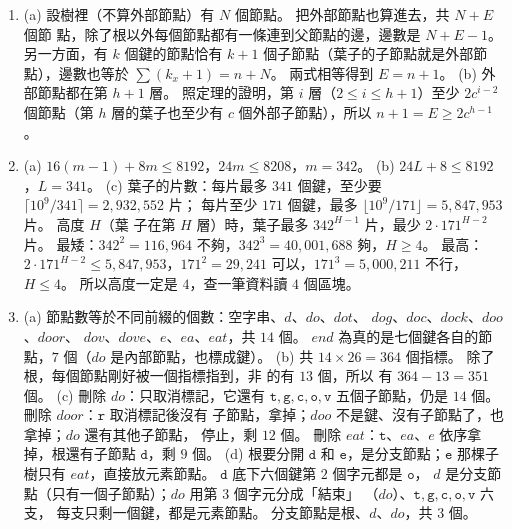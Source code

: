 \begin{enumerate}
\item (a) 設樹裡（不算外部節點）有 $N$ 個節點。 把外部節點也算進去，共 $N + E$ 個節
點，除了根以外每個節點都有一條連到父節點的邊，邊數是 $N + E - 1$。 另一方面，有
$k$ 個鍵的節點恰有 $k + 1$ 個子節點（葉子的子節點就是外部節點），邊數也等於
$\sum (k_x + 1) = n + N$。 兩式相等得到 $E = n + 1$。
(b) 外部節點都在第 $h + 1$ 層。 照定理的證明，第 $i$ 層（$2 \le i \le h + 1$）至少
$2c^{i-2}$ 個節點（第 $h$ 層的葉子也至少有 $c$ 個外部子節點），所以
$n + 1 = E \ge 2c^{h-1}$。

\item (a) $16(m - 1) + 8m \le 8192$，$24m \le 8208$，$m = 342$。
(b) $24L + 8 \le 8192$，$L = 341$。
(c) 葉子的片數：每片最多 $341$ 個鍵，至少要 $\lceil 10^9 / 341 \rceil = 2{,}932{,}552$ 片；
每片至少 $171$ 個鍵，最多 $\lfloor 10^9 / 171 \rfloor = 5{,}847{,}953$ 片。 高度 $H$（葉
子在第 $H$ 層）時，葉子最多 $342^{H-1}$ 片，最少 $2 \cdot 171^{H-2}$ 片。
最矮：$342^2 = 116{,}964$ 不夠，$342^3 = 40{,}001{,}688$ 夠，$H \ge 4$。
最高：$2 \cdot 171^{H-2} \le 5{,}847{,}953$，$171^2 = 29{,}241$ 可以，$171^3 = 5{,}000{,}211$
不行，$H \le 4$。 所以高度一定是 $4$，查一筆資料讀 $4$ 個區塊。

\item (a) 節點數等於不同前綴的個數：空字串、$\mathit{d}$、$\mathit{do}$、$\mathit{dot}$、
$\mathit{dog}$、$\mathit{doc}$、$\mathit{dock}$、$\mathit{doo}$、$\mathit{door}$、
$\mathit{dov}$、$\mathit{dove}$、$\mathit{e}$、$\mathit{ea}$、$\mathit{eat}$，共 $14$ 個。
$\mathit{end}$ 為真的是七個鍵各自的節點，$7$ 個（$\mathit{do}$ 是內部節點，也標成鍵）。
(b) 共 $14 \times 26 = 364$ 個指標。 除了根，每個節點剛好被一個指標指到，非 \NIL 的有
$13$ 個，所以 \NIL 有 $364 - 13 = 351$ 個。
(c) 刪除 $\mathit{do}$：只取消標記，它還有 $\mathtt{t}, \mathtt{g}, \mathtt{c}, \mathtt{o},
\mathtt{v}$ 五個子節點，仍是 $14$ 個。 刪除 $\mathit{door}$：$\mathtt{r}$ 取消標記後沒有
子節點，拿掉；$\mathit{doo}$ 不是鍵、沒有子節點了，也拿掉；$\mathit{do}$ 還有其他子節點，
停止，剩 $12$ 個。 刪除 $\mathit{eat}$：$\mathtt{t}$、$\mathit{ea}$、$\mathit{e}$ 依序拿
掉，根還有子節點 $\mathtt{d}$，剩 $9$ 個。
(d) 根要分開 $\mathtt{d}$ 和 $\mathtt{e}$，是分支節點；$\mathtt{e}$ 那棵子樹只有
$\mathit{eat}$，直接放元素節點。 $\mathtt{d}$ 底下六個鍵第 $2$ 個字元都是 $\mathtt{o}$，
$\mathit{d}$ 是分支節點（只有一個子節點）；$\mathit{do}$ 用第 $3$ 個字元分成「結束」
（$\mathit{do}$）、$\mathtt{t}, \mathtt{g}, \mathtt{c}, \mathtt{o}, \mathtt{v}$ 六支，
每支只剩一個鍵，都是元素節點。 分支節點是根、$\mathit{d}$、$\mathit{do}$，共 $3$ 個。


\end{enumerate}
